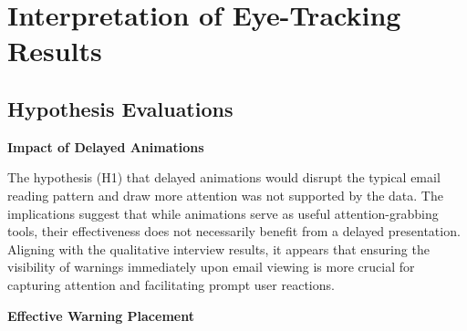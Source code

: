 \documentclass[
  a4paper,  %
  twoside,  %
  bibliography=totoc,
  headsepline,
  cleardoublepage=empty,
  parskip=half,
  draft=false
]{scrbook}
\begin{document}



\newpage
\section{Interpretation of Eye-Tracking Results}
\subsection{Hypothesis Evaluations}

\textbf{Impact of Delayed Animations}

The hypothesis (H1) that delayed animations would disrupt the typical email reading pattern and draw more attention was not supported by the data. The implications suggest that while animations serve as useful attention-grabbing tools, their effectiveness does not necessarily benefit from a delayed presentation. Aligning with the qualitative interview results, it appears that ensuring the visibility of warnings immediately upon email viewing is more crucial for capturing attention and facilitating prompt user reactions.

\textbf{Effective Warning Placement}
\end{document}
